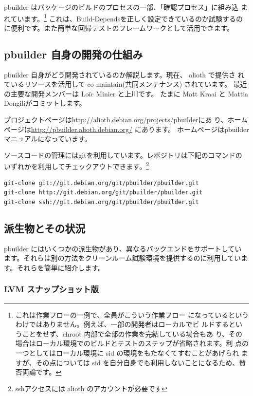 \documentclass[mingoth,a4paper]{jsarticle}
\begin{document}
pbuilder はパッケージのビルドのプロセスの一部、「確認プロセス」に組み込
まれています。\footnote{これは作業フローの一例で、全員がこういう作業フロー
になっているというわけではありません。例えば、一部の開発者はローカルでビ
ルドするということをせず、chroot 内部で全部の作業を完結している場合もあ
り、その場合はローカル環境でのビルドとテストのステップが省略されます。利
点の一つとしてはローカル環境に sid の環境をもたなくてすむことがあげられ
ますが、その点については sid を自分自身でも利用しないことになるため、賛
否両論です。} これは、Build-Dependsを正しく設定できているのか試験するの
に便利です。また簡単な回帰テストのフレームワークとして活用できます。

\subsection{pbuilder 自身の開発の仕組み}

pbuilder 自身がどう開発されているのか解説します。現在、 alioth で提供さ
れているリソースを活用して co-maintain(共同メンテナンス) されています。
最近の主要な開発メンバーは Lo\"ic Minier と上川です。
たまに Matt Kraai と Mattia Dongiliがコミットします。

プロジェクトページは\url{http://alioth.debian.org/projects/pbuilder}にあ
り、ホームページは\url{http://pbuilder.alioth.debian.org/} にあります。
ホームページはpbuilderマニュアルになっています。

ソースコードの管理にはgitを利用しています。レポジトリは下記のコマンドの
いずれかを利用してチェックアウトできます。\footnote{sshアクセスには 
alioth のアカウントが必要です}

\begin{verbatim}
git-clone git://git.debian.org/git/pbuilder/pbuilder.git
git-clone http://git.debian.org/git/pbuilder/pbuilder.git
git-clone ssh://git.debian.org/git/pbuilder/pbuilder.git
\end{verbatim}

\subsection{派生物とその状況}

pbuilder にはいくつかの派生物があり、異なるバックエンドをサポートしてい
ます。それらは別の方法をクリーンルーム試験環境を提供するのに利用していま
す。それらを簡単に紹介します。

\subsubsection{LVM スナップショット版}
\end{document}
